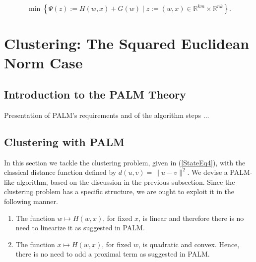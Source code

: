 \documentclass[11pt]{article}
\numberwithin{equation}{section}
\begin{document}
\begin{equation}
	\min \left\lbrace \Psi(z) := H(w,x) + G(w) \mid z := (w,x) \in \mathbb{R}^{km} \times \mathbb{R}^{nk} \right\rbrace . \label{StateEq4}
\end{equation}


\section{Clustering: The Squared Euclidean Norm Case} \label{State_Clustering_SqNorm}

\subsection{Introduction to the PALM Theory} \label{State_PALM_Theory}

Presentation of PALM's requirements and of the algorithm steps  $\ldots$


\subsection{Clustering with PALM}

In this section we tackle the clustering problem, given in (\ref{StateEq4}), with the classical distance function defined by $d(u,v) = \|u-v\|^2$. We devise a PALM-like algorithm, based on the discussion in the previous subsection.
Since the clustering problem has a specific structure, we are ought to exploit it in the following manner.
\begin{enumerate}[(1)]
	\item The function $w \mapsto H(w,x)$, for fixed $x$, is linear and therefore there is no need to linearize it as suggested in PALM.
	\item The function $x \mapsto H(w,x)$, for fixed $w$, is quadratic and convex. Hence, there is no need to add a proximal term as suggested in PALM.
\end{enumerate}
\end{document}
